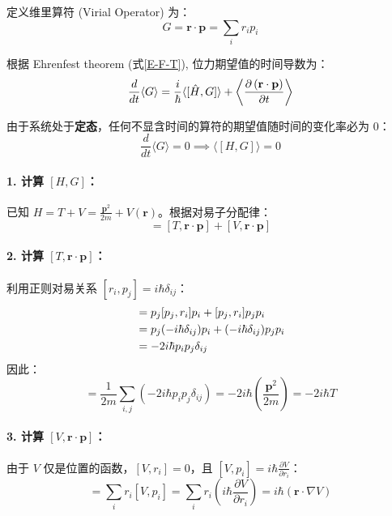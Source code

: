 定义维里算符 (Virial Operator) 为：
\begin{equation}
	G = \mathbf{r} \cdot \mathbf{p} = \sum_{i} r_i p_i
\end{equation}

根据 Ehrenfest theorem (式\ref{E-F-T}), 位力期望值的时间导数为：
\begin{equation}
	\frac{d}{dt}\langle G \rangle = \frac{i}{\hbar} \langle [\hat{H}, G] \rangle +\left\langle {\frac{{\partial \left( {{\bf{r}} \cdot {\bf{p}}} \right)}}{{\partial t}}} \right\rangle
\end{equation}

由于系统处于\textbf{定态}，任何不显含时间的算符的期望值随时间的变化率必为 0：
\begin{equation}
	\frac{d}{dt}\langle G \rangle = 0 \implies \langle [H, G] \rangle = 0
\end{equation}

\paragraph{1. 计算 $[H, G]$： }

已知 $H = T + V = \frac{\mathbf{p}^2}{2m} + V(\mathbf{r})$。根据对易子分配律：
\begin{equation}
	[H, G] = [T, \mathbf{r} \cdot \mathbf{p}] + [V, \mathbf{r} \cdot \mathbf{p}]
\end{equation}

\paragraph{2. 计算 $[T, \mathbf{r} \cdot \mathbf{p}]$：}
利用正则对易关系 $[r_i, p_j] = i\hbar \delta_{ij}$：
\begin{align}
	[p_j^2, r_i p_i] &= p_j [p_j, r_i] p_i + [p_j, r_i] p_j p_i \notag \\
	&= p_j (-i\hbar \delta_{ij}) p_i + (-i\hbar \delta_{ij}) p_j p_i \notag \\
	&= -2i\hbar p_i p_j \delta_{ij}
\end{align}
因此：
\begin{equation}
	[T, \mathbf{r} \cdot \mathbf{p}] = \frac{1}{2m} \sum_{i,j} (-2i\hbar p_i p_j \delta_{ij}) = -2i\hbar \left( \frac{\mathbf{p}^2}{2m} \right) = -2i\hbar T
\end{equation}

\paragraph{3. 计算 $[V, \mathbf{r} \cdot \mathbf{p}]$：}
由于 $V$ 仅是位置的函数，$[V, r_i] = 0$，且 $\displaystyle [V, p_i] = i\hbar \frac{\partial V}{\partial r_i}$：
\begin{equation}
	[V, \mathbf{r} \cdot \mathbf{p}] = \sum_i r_i [V, p_i] = \sum_i r_i \left( i\hbar \frac{\partial V}{\partial r_i} \right) = i\hbar (\mathbf{r} \cdot \nabla V)
\end{equation}

